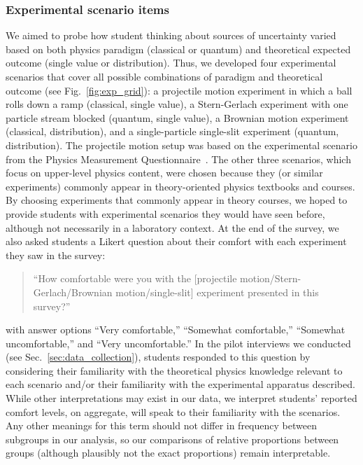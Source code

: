 \documentclass[english,aps,prstper,reprint,showpacs,longbibliography,superscriptaddress,nofootinbib]{revtex4-2}
\begin{document}
\subsubsection{Experimental scenario items}
We aimed to probe how student thinking about sources of uncertainty varied based on both physics paradigm (classical or quantum) and theoretical expected outcome (single value or distribution). Thus, we developed four experimental scenarios that cover all possible combinations of paradigm and theoretical outcome (see Fig.~\ref{fig:exp_grid}): a projectile motion experiment in which a ball rolls down a ramp (classical, single value), a Stern-Gerlach experiment with one particle stream blocked (quantum, single value), a Brownian motion experiment (classical, distribution), and a single-particle single-slit experiment (quantum, distribution). The projectile motion setup was based on the experimental scenario from the Physics Measurement Questionnaire~\cite{Allie1998}. The other three scenarios, which focus on upper-level physics content, were chosen because they (or similar experiments) commonly appear in theory-oriented physics textbooks and courses. 
By choosing experiments that commonly appear in theory courses, we hoped to provide students with experimental scenarios they would have seen before, although not necessarily in a laboratory context. At the end of the survey, we also asked students a Likert question about their comfort with each experiment they saw in the survey: 
\begin{quote}
``How comfortable were you with the [projectile motion/Stern-Gerlach/Brownian motion/single-slit] experiment presented in this survey?''
\end{quote}
with answer options ``Very comfortable,'' ``Somewhat comfortable,'' ``Somewhat uncomfortable,'' and ``Very uncomfortable.'' In the pilot interviews we conducted (see Sec.~\ref{sec:data_collection}), students responded to this question by considering their familiarity with the theoretical physics knowledge relevant to each scenario and/or their familiarity with the experimental apparatus described. While other interpretations may exist in our data, we interpret students' reported comfort levels, on aggregate, will speak to their familiarity with the scenarios. Any other meanings for this term should not differ in frequency between subgroups in our analysis, so our comparisons of relative proportions between groups  (although plausibly not the exact proportions) remain interpretable.
\end{document}
